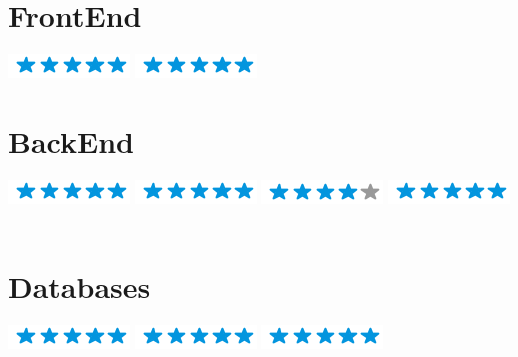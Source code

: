 \documentclass[american]{cv-class}
\begin{document}
\begin{aside}
	\section{FrontEnd}
	{\includegraphics[scale=0.40]{img/5stars.png}}
	{\includegraphics[scale=0.40]{img/5stars.png}}
	~
	
	\section{BackEnd}
	{\includegraphics[scale=0.40]{img/5stars.png}}
	{\includegraphics[scale=0.40]{img/5stars.png}}
	{\includegraphics[scale=0.40]{img/4stars.png}}
	{\includegraphics[scale=0.40]{img/5stars.png}}
	~
	
	\section{Databases}
	{\includegraphics[scale=0.40]{img/5stars.png}}
	{\includegraphics[scale=0.40]{img/5stars.png}}
	{\includegraphics[scale=0.40]{img/5stars.png}}
	
\end{aside}
\end{document}
